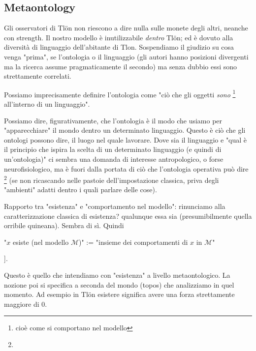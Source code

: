 \subsection{Metaontology} Gli osservatori di Tl\"on non riescono a dire nulla sulle monete degli altri, neanche con strength. Il nostro modello è inutilizzabile \emph{dentro} Tl\"on; ed è dovuto alla diversità di linguaggio dell'abitante di Tlon. Sospendiamo il giudizio su cosa venga "prima", se l'ontologia o il linguaggio (gli autori hanno posizioni divergenti ma la ricerca assume pragmaticamente il secondo) ma senza dubbio essi sono strettamente correlati.

Possiamo imprecisamente definire l'ontologia come "ciò che gli oggetti \emph{sono} \footnote{cioè come si comportano nel modello} all'interno di un linguaggio".

 Possiamo dire, figurativamente, che l'ontologia è il modo che usiamo per "apparecchiare" il mondo dentro un determinato linguaggio. Questo è ciò che gli ontologi possono dire, il luogo nel quale lavorare.
 Dove sia il linguaggio e "qual è il principio che ispira la scelta di un determinato linguaggio (e quindi di un'ontologia)" ci sembra una domanda di interesse antropologico, o forse neurofisiologico, ma è fuori dalla portata di ciò che l'ontologia operativa può dire \footnote{\endde} (se non ricascando nelle pastoie dell'impostazione classica, priva degli "ambienti" adatti dentro i quali parlare delle cose). 
 
 Rapporto tra "esistenza" e "comportamento nel modello": rinunciamo alla caratterizzazione classica di esistenza? qualunque essa sia (presumibilmente quella orribile quineana). Sembra di sì. Quindi 
 \begin{center}
 	"$x$ esiste (nel modello $\mathcal{M}$)" := "insieme dei comportamenti di $x$ in $\mathcal{M}$"
 \end{center}
  \endde]. 
 
 Questo è quello che intendiamo con "esistenza" a livello metaontologico. La nozione poi si specifica a seconda del mondo (topos) che analizziamo in quel momento. Ad esempio in Tl\"on esistere significa avere una forza strettamente maggiore di 0.  

